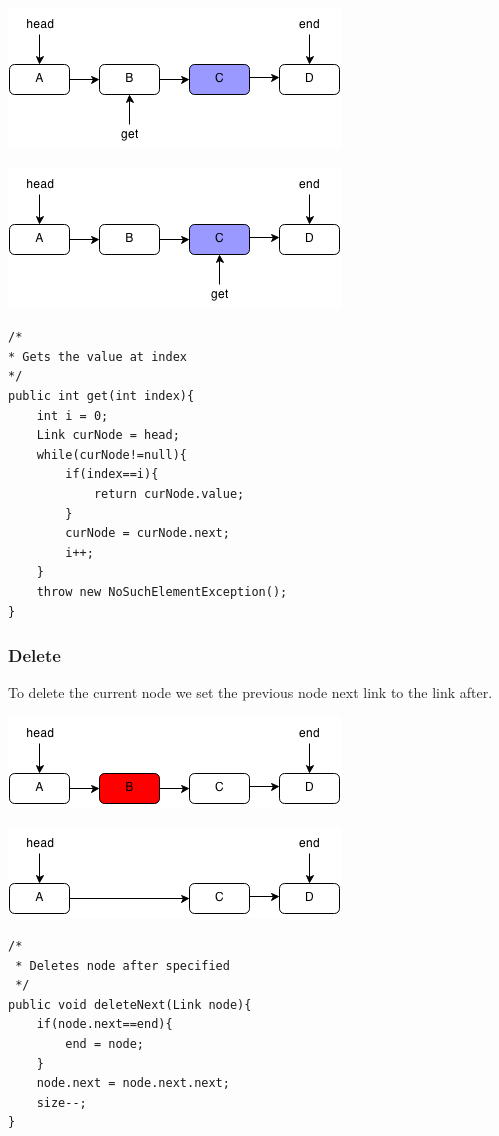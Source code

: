 \documentclass[11pt,oneside]{book}
\makeatletter
\def\maxwidth#1{\ifdim\Gin@nat@width>#1 #1\else\Gin@nat@width\fi}
\makeatother
\begin{document}
\includegraphics[width=\maxwidth{\textwidth}]{linkedlistget2.png}

\includegraphics[width=\maxwidth{\textwidth}]{linkedlistget3.png}

\begin{lstlisting}
/*
* Gets the value at index
*/
public int get(int index){
    int i = 0;
    Link curNode = head;
    while(curNode!=null){
        if(index==i){
            return curNode.value;
        }
        curNode = curNode.next;
        i++;
    }
    throw new NoSuchElementException();
}
\end{lstlisting}

\subsubsection{Delete}

To delete the current node we set the previous node next link to the link after.

\includegraphics[width=\maxwidth{\textwidth}]{linkedlistrem.png}

\includegraphics[width=\maxwidth{\textwidth}]{linkedlistrem2.png}

\begin{lstlisting}
/*
 * Deletes node after specified
 */
public void deleteNext(Link node){
    if(node.next==end){
        end = node;
    }
    node.next = node.next.next;
    size--;
}
\end{lstlisting}
\end{document}
